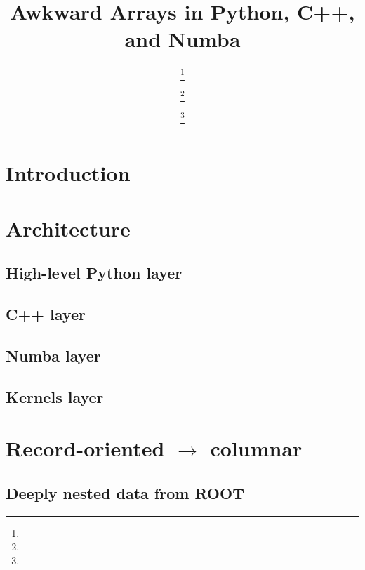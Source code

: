 \documentclass{webofc}
\begin{document}
\title{Awkward Arrays in Python, C++, and Numba}

\author{%
 \fnsep\thanks{} \and
{} \fnsep\thanks{} \and
{} \fnsep\thanks{}}



\maketitle

\section{Introduction}

\section{Architecture}

\subsection{High-level Python layer}

\subsection{C++ layer}

\subsection{Numba layer}

\subsection{Kernels layer}

\section{Record-oriented $\to$ columnar}

\subsection{Deeply nested data from ROOT}
\end{document}
